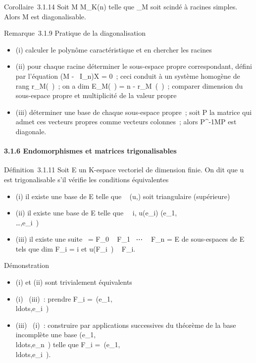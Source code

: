 \documentclass[]{article}
\begin{document}
Corollaire~3.1.14 Soit M \in M\_K(n) telle que \chi\_M soit
scindé à racines simples. Alors M est diagonalisable.

Remarque~3.1.9 Pratique de la diagonalisation

\begin{itemize}
\itemsep1pt\parskip0pt
\item
  (i) calculer le polynôme caractéristique et en chercher les racines
\item
  (ii) pour chaque racine déterminer le sous-espace propre
  correspondant, défini par l'équation (M - \lambda~I\_n)X = 0~; ceci
  conduit à un système homogène de rang r\_M(\lambda~)~; on a
  dim E\_M(\lambda~) = n - r\_M~(\lambda~)~;
  comparer dimension du sous-espace propre et multiplicité de la valeur
  propre
\item
  (iii) déterminer une base de chaque sous-espace propre~; soit P la
  matrice qui admet ces vecteurs propres comme vecteurs colonnes~; alors
  P^-1MP est diagonale.
\end{itemize}

\paragraph{3.1.6 Endomorphismes et matrices trigonalisables}

Définition~3.1.11 Soit E un K-espace vectoriel de dimension finie. On
dit que u est trigonalisable s'il vérifie les conditions équivalentes

\begin{itemize}
\itemsep1pt\parskip0pt
\item
  (i) il existe une base  de E telle que
  \mathrmMat~ (u,) soit
  triangulaire (supérieure)
\item
  (ii) il existe une base  de E telle que \forall~~i,
  u(e\_i)
  \in\mathrmVect(e\_1,\\\ldots,e\_i~)
\item
  (iii) il existe une suite \0\ =
  F\_0 \subset~ F\_1 \subset~⋯ \subset~
  F\_n = E de sous-espaces de E tels que
  dim F\_i = i et u(F\_i~) \subset~
  F\_i.
\end{itemize}

Démonstration

\begin{itemize}
\itemsep1pt\parskip0pt
\item
  (i) et (ii) sont trivialement équivalents
\item
  (i) \rigtharrow~(iii)~: prendre F\_i =\
  \mathrmVect(e\_1,\\ldots,e\_i~)
\item
  (iii) \rigtharrow~(i)~: construire par applications successives du théorème de la
  base incomplète une base
  (e\_1,\\ldots,e\_n~)
  telle que F\_i =\
  \mathrmVect(e\_1,\\ldots,e\_i~).
\end{itemize}
\end{document}
